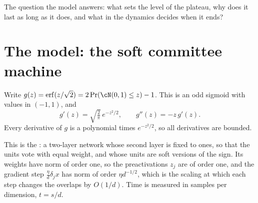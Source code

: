 \begin{refsection}
The question the model answers: what sets the level of the plateau, why does it last as long as it does, and what in the dynamics decides when it ends?

\section{The model: the soft committee machine}\label{sec:committee:model}

Write $g(z)=\erf(z/\sqrt2)=2\Pr(\cN(0,1)\le z)-1$. This is an odd sigmoid with values in $(-1,1)$, and
\begin{equation}\label{eq:committee:gprime}
  g'(z)=\sqrt{\tfrac2\pi}\,e^{-z^2/2},\qquad g''(z)=-z\,g'(z).
\end{equation}
Every derivative of $g$ is a polynomial times $e^{-z^2/2}$, so all derivatives are bounded.


This is the : a two-layer network whose second layer is fixed to ones, so that the units vote with equal weight, and whose units are soft versions of the sign. Its weights have norm of order one, so the preactivations $z_j$ are of order one, and the gradient step $\frac\eta d\delta_jx$ has norm of order $\eta d^{-1/2}$, which is the scaling at which each step changes the overlaps by $O(1/d)$. Time is measured in samples per dimension, $t=s/d$.


\end{refsection}

